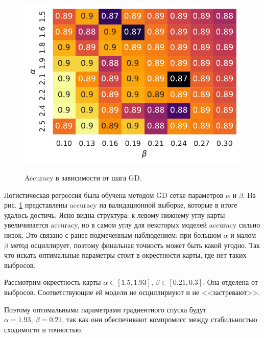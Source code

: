\documentclass[12pt]{extarticle}
\begin{document}
\begin{figure}
    \centering
    \vspace{-7mm}
    \caption{Accuracy в зависимости от шага GD.}
    \includegraphics[width=1\linewidth]{pics/accur_step.pdf}
    \vspace{-8mm}
    \label{fig:accur_step}
\end{figure}
Логистическая регрессия была обучена методом GD сетке параметров $\alpha$ и $\beta$. На рис. \ref{fig:accur_step} представлены accuracy на валидационной выборке, которые в итоге удалось достичь. Ясно видна структура: к левому нижнему углу карты увеличивается accuracy, но в самом углу для некоторых моделей accuracy сильно низок. Это связано с ранее подмеченным наблюдением: при большом $\alpha$ и малом $\beta$ метод осциллирует, поэтому финальная точность может быть какой угодно. Так что искать оптимальные параметры стоит в окрестности карты, где нет таких выбросов.

Рассмотрим окрестность карты $\alpha\in[1.5, 1.93]$, $\beta\in[0.21, 0.3]$. Она отделена от выбросов. Соответствующие ей модели не осциллириуют и не <<застревают>>.

Поэтому оптимальными параметрами градиентного спуска будут $\alpha=1.93,\ \beta=0.21$, так как они обеспечивают компромисс между стабильностью сходимости и точностью.

\end{document}
